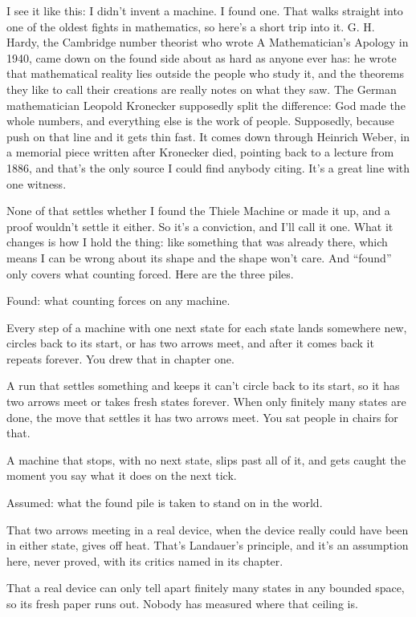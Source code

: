\documentclass[11pt,twoside]{article}
\theoremstyle{thielethm}
\theoremstyle{thieledef}
\theoremstyle{thieledef}
\theoremstyle{thieledef}
\theoremstyle{thielethm}
\theoremstyle{thieleobs}
\theoremstyle{thielethm}
\begin{document}
I see it like this: I didn't invent a machine. I found one. That walks straight into one of the oldest fights in mathematics, so here's a short trip into it. G. H. Hardy, the Cambridge number theorist who wrote A Mathematician's Apology in 1940, came down on the found side about as hard as anyone ever has: he wrote that mathematical reality lies outside the people who study it, and the theorems they like to call their creations are really notes on what they saw. The German mathematician Leopold Kronecker supposedly split the difference: God made the whole numbers, and everything else is the work of people. Supposedly, because push on that line and it gets thin fast. It comes down through Heinrich Weber, in a memorial piece written after Kronecker died, pointing back to a lecture from 1886, and that's the only source I could find anybody citing. It's a great line with one witness.

None of that settles whether I found the Thiele Machine or made it up, and a proof wouldn't settle it either. So it's a conviction, and I'll call it one. What it changes is how I hold the thing: like something that was already there, which means I can be wrong about its shape and the shape won't care. And ``found'' only covers what counting forced. Here are the three piles.

Found: what counting forces on any machine.

Every step of a machine with one next state for each state lands somewhere new, circles back to its start, or has two arrows meet, and after it comes back it repeats forever. You drew that in chapter one.

A run that settles something and keeps it can't circle back to its start, so it has two arrows meet or takes fresh states forever. When only finitely many states are done, the move that settles it has two arrows meet. You sat people in chairs for that.

A machine that stops, with no next state, slips past all of it, and gets caught the moment you say what it does on the next tick.

Assumed: what the found pile is taken to stand on in the world.

That two arrows meeting in a real device, when the device really could have been in either state, gives off heat. That's Landauer's principle, and it's an assumption here, never proved, with its critics named in its chapter.

That a real device can only tell apart finitely many states in any bounded space, so its fresh paper runs out. Nobody has measured where that ceiling is.
\end{document}
